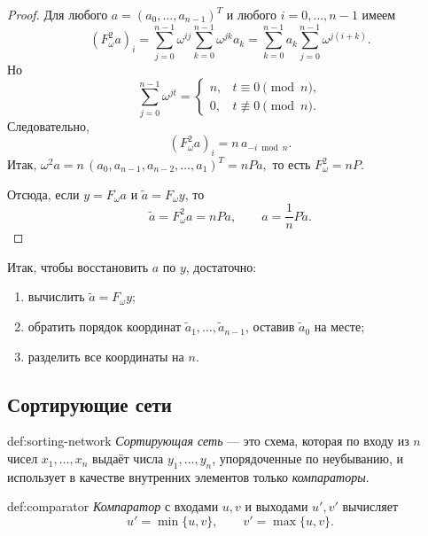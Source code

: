 \begin{proof}
	Для любого $a=(a_0,\dots,a_{n-1})^T$ и любого $i=0,\dots,n-1$ имеем
	\[
	(F_\omega^2 a)_i
	=
	\sum_{j=0}^{n-1}\omega^{ij}\sum_{k=0}^{n-1}\omega^{jk}a_k
	=
	\sum_{k=0}^{n-1} a_k \sum_{j=0}^{n-1}\omega^{j(i+k)}.
	\]
	Но
	\[
	\sum_{j=0}^{n-1}\omega^{jt}
	=
	\begin{cases}
		n, & t \equiv 0 \pmod n,\\
		0, & t \not\equiv 0 \pmod n.
	\end{cases}
	\]
	Следовательно,
	\[
	(F_\omega^2 a)_i = n\,a_{-i \bmod n}.
	\]
	Итак, $\omega^2 a = n\,(a_0,a_{n-1},a_{n-2},\dots,a_1)^T = nPa,$ то есть $F_\omega^2 = nP.$

	Отсюда, если $y=F_\omega a$ и $\tilde a = F_\omega y$, то
	\[
	\tilde a = F_\omega^2 a = nPa,
	\qquad
	a = \frac1n P\tilde a.
	\]
\end{proof}

	Итак, чтобы восстановить $a$ по $y$, достаточно:
	\begin{enumerate}
		\item вычислить $\tilde a = F_\omega y$;
		\item обратить порядок координат $\tilde a_1,\dots,\tilde a_{n-1}$, оставив $\tilde a_0$ на месте;
		\item разделить все координаты на $n$.
	\end{enumerate}


\subsection{Сортирующие сети}

\begin{Definition}{}{def:sorting-network}
	\emph{Сортирующая сеть} --- это схема, которая по входу из $n$ чисел $x_1,\dots,x_n$ выдаёт числа $y_1,\dots,y_n$, упорядоченные по неубыванию, и использует в качестве внутренних элементов только \emph{компараторы}.
\end{Definition}

\begin{Definition}{}{def:comparator}
	\emph{Компаратор} с входами $u,v$ и выходами $u',v'$ вычисляет
	\[
	u' = \min\{u,v\},
	\qquad
	v' = \max\{u,v\}.
	\]
\end{Definition}


